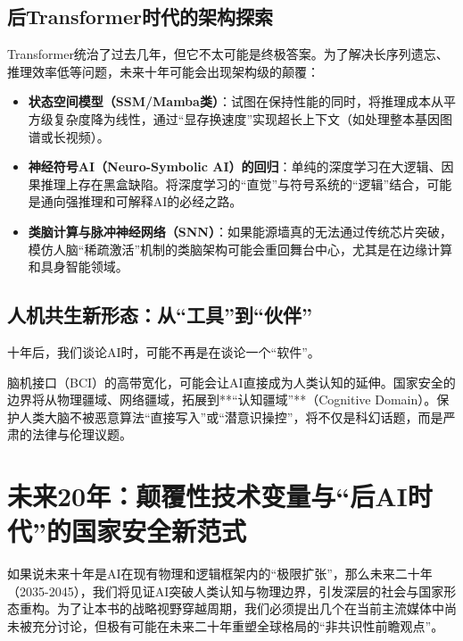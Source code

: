 \subsection{后Transformer时代的架构探索}

Transformer统治了过去几年，但它不太可能是终极答案。为了解决长序列遗忘、推理效率低等问题，未来十年可能会出现架构级的颠覆：

\begin{itemize}
    \item \textbf{状态空间模型（SSM/Mamba类）}：试图在保持性能的同时，将推理成本从平方级复杂度降为线性，通过“显存换速度”实现超长上下文（如处理整本基因图谱或长视频）。
    \item \textbf{神经符号AI（Neuro-Symbolic AI）的回归}：单纯的深度学习在大逻辑、因果推理上存在黑盒缺陷。将深度学习的“直觉”与符号系统的“逻辑”结合，可能是通向强推理和可解释AI的必经之路。
    \item \textbf{类脑计算与脉冲神经网络（SNN）}：如果能源墙真的无法通过传统芯片突破，模仿人脑“稀疏激活”机制的类脑架构可能会重回舞台中心，尤其是在边缘计算和具身智能领域。
\end{itemize}

\subsection{人机共生新形态：从“工具”到“伙伴”}

十年后，我们谈论AI时，可能不再是在谈论一个“软件”。

脑机接口（BCI）的高带宽化，可能会让AI直接成为人类认知的延伸。国家安全的边界将从物理疆域、网络疆域，拓展到**“认知疆域”**（Cognitive Domain）。保护人类大脑不被恶意算法“直接写入”或“潜意识操控”，将不仅是科幻话题，而是严肃的法律与伦理议题。

\section{未来20年：颠覆性技术变量与“后AI时代”的国家安全新范式}

如果说未来十年是AI在现有物理和逻辑框架内的“极限扩张”，那么未来二十年（2035-2045），我们将见证AI突破人类认知与物理边界，引发深层的社会与国家形态重构。为了让本书的战略视野穿越周期，我们必须提出几个在当前主流媒体中尚未被充分讨论，但极有可能在未来二十年重塑全球格局的“非共识性前瞻观点”。

